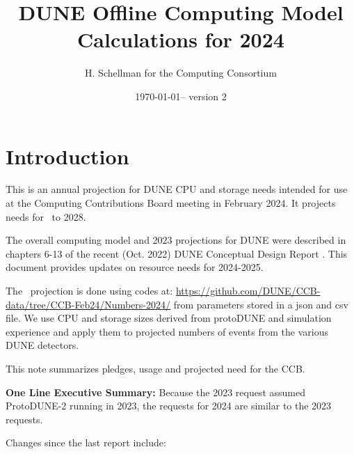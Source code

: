 \documentclass[12pt]{article}
\title{DUNE Offline Computing Model Calculations for 2024}
\author{H. Schellman for the Computing Consortium}
\date{\today -- version 2}
\begin{document}
\makeatletter
{}
\makeatother
\newcommand{\csvautotabularright}[2][]{\csvloop{autotabularright={#2},#1}}

\maketitle



\section{Introduction}

This is an annual projection for DUNE CPU and storage needs intended for use at the Computing Contributions Board meeting in February 2024. It projects needs for \ThisYear\ to 2028. 

The overall computing model  and 2023 projections for DUNE were described in chapters 6-13 of the recent (Oct. 2022) DUNE Conceptual Design Report \cite{DUNE:2022fcw}.   This document provides updates on resource needs for 2024-2025. 

The \ThisYear\ projection is done using codes at: \href{https://github.com/DUNE/CCB-data/tree/CCB-Feb24/Numbers-2024/}{https://github.com/DUNE/CCB-data/tree/CCB-Feb24/Numbers-2024/} from parameters stored in a json and csv file. We use CPU and storage sizes derived from protoDUNE and simulation experience and apply them to projected numbers of events from the various DUNE detectors. 

This note summarizes pledges, usage and projected need for the CCB.

{\bf One Line Executive Summary:} Because the 2023 request assumed ProtoDUNE-2 running in 2023, the requests for 2024 are similar to the 2023 requests.





Changes since the last report \cite{CCB2023Report, CCB2023Minutes} include:
\end{document}
